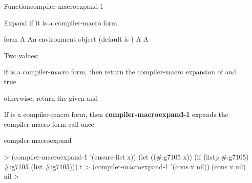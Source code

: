 \documentclass[10pt,twoside,english,pdftex]{article}
\begin{document}
\begin{functiondoc}{Function}{compiler-macroexpand-1}{%
       
    \mbox{\returns{} }}
%
%
  
\fnsyntax

\fnpurpose Expand  if it is a compiler-macro form.

\fnpackage {}

\fnmodule {}

\fnargs
\begin{args}{form}
\arg[form] A 
\arg[env] An environment object (default is \nil)
\arg[expansion] A 
\arg[expanded-p] A 
\end{args}

\fnreturns
Two values:
\begin{tightitemize}
\item if  is a compiler-macro form, then return the compiler-macro
  expansion of  and true
\item otherwise, return the given  and \nil{}
\end{tightitemize}

\fndescription 
%
If  is a compiler-macro form, then \textbf{compiler-macroexpand-1}
expands the compiler-macro-form call once.

\begin{alsos}{compiler-macroexpand}
\end{alsos}

\fnexamples
%
\W\supp
\begin{example}
  > (compiler-macroexpand-1 '(ensure-list x))
  (let ((#:g7105 x)) (if (listp #:g7105) #:g7105 (list #:g7105)))
  t
  > (compiler-macroexpand-1 '(cons x nil))
  (cons x nil)
  nil
  >
\end{example}

\end{functiondoc}

\end{document}
